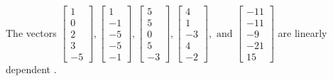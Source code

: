\begin{exercise}
\begin{exerciseStatement}
  \end{exerciseStatement}
  \begin{exerciseAnswer}
   The vectors \(\left[\begin{array}{r}
1 \\
0 \\
2 \\
3 \\
-5
\end{array}\right] , \left[\begin{array}{r}
1 \\
-1 \\
-5 \\
-5 \\
-1
\end{array}\right] , \left[\begin{array}{r}
5 \\
5 \\
0 \\
5 \\
-3
\end{array}\right] , \left[\begin{array}{r}
4 \\
1 \\
-3 \\
4 \\
-2
\end{array}\right] , \text{ and } \left[\begin{array}{r}
-11 \\
-11 \\
-9 \\
-21 \\
15
\end{array}\right]\) are 
  	 linearly dependent  .
  


  \end{exerciseAnswer}
\end{exercise}
